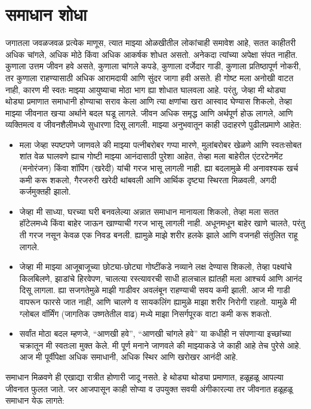  \chapter{समाधान शोधा}
जगातला जवळजवळ प्रत्येक माणूस, त्यात माझ्या ओळखीतील लोकांचाही समावेश आहे, सतत काहीतरी अधिक चांगले, अधिक मोठे किंवा अधिक आकर्षक शोधत असतो. अनेकदा त्यांच्या अपेक्षा संपत नाहीत. कुणाला उत्तम जीवन हवे असते, कुणाला चांगले कपडे, कुणाला दर्जेदार गाडी, कुणाला प्रतिष्ठापूर्ण नोकरी, तर कुणाला राहण्यासाठी अधिक आरामदायी आणि सुंदर जागा हवी असते.
ही गोष्ट मला अनोखी वाटत नाही, कारण मी स्वतः माझ्या आयुष्याचा मोठा भाग ह्या शोधात घालवला आहे. परंतु, जेव्हा मी थोड्या थोड्या प्रमाणात समाधानी होण्याचा सराव केला आणि त्या क्षणांचा खरा आस्वाद घेण्यास शिकलो, तेव्हा माझ्या जीवनात खऱ्या अर्थाने बदल घडू लागले. जीवन अधिक समृद्ध आणि अर्थपूर्ण होऊ लागले, आणि व्यक्तिमत्व व जीवनशैलीमध्ये सुधारणा दिसू लागली.
माझ्या अनुभवातून काही उदाहरणे पुढीलप्रमाणे आहेत:
\begin{itemize}
 \item मला जेव्हा स्पष्टपणे जाणवले की माझ्या पत्नीबरोबर गप्पा मारणे, मुलांबरोबर खेळणे आणि स्वतःसोबत शांत वेळ घालवणे ह्याच गोष्टी माझ्या आनंदासाठी पुरेशा आहेत, तेव्हा मला बाहेरील एंटरटेनमेंट (मनोरंजन) किंवा शॉपिंग (खरेदी) यांची गरज भासू लागली नाही. ह्या बदलामुळे मी अनावश्यक खर्च कमी करू शकलो, गैरजरुरी खरेदी थांबवली आणि आर्थिक दृष्ट्या स्थिरता मिळवली, अगदी कर्जमुक्तही झालो.
\item जेव्हा मी साध्या, घरच्या घरी बनवलेल्या अन्नात समाधान मानायला शिकलो, तेव्हा मला सतत हॉटेलमध्ये किंवा बाहेर जाऊन खाण्याची गरज भासू लागली नाही. अधूनमधून बाहेर खाणे चालते, परंतु ती गरज नसून केवळ एक निवड बनली. ह्यामुळे माझे शरीर हलके झाले आणि वजनही संतुलित राहू लागले.
\item जेव्हा मी माझ्या आजूबाजूच्या छोट्या-छोट्या गोष्टींकडे नव्याने लक्ष देण्यास शिकलो, तेव्हा पक्ष्यांचे किलबिलणे, झाडांचे हिरवेपण, चालत्या रस्त्यावरची साधी हालचाल ह्यांतही मला आश्चर्य आणि आनंद दिसू लागला. ह्या सजगतेमुळे माझी गाडीवर अवलंबून राहण्याची सवय कमी झाली. आज मी गाडी वापरून फारसे जात नाही, आणि चालणे व सायकलिंग ह्यामुळे माझा शरीर निरोगी राहतो. यामुळे मी ग्लोबल वॉर्मिंग (जागतिक उष्णतेतील वाढ) मध्ये माझा निसर्गपूरक वाटा कमी करू शकतो.
\item सर्वांत मोठा बदल म्हणजे, “आणखी हवे”, “आणखी चांगले हवे” या कधीही न संपणाऱ्या इच्छांच्या चक्रातून मी स्वतःला मुक्त केले. मी पूर्ण मनाने जाणवले की माझ्याकडे जे काही आहे तेच पुरेसे आहे. आज मी पूर्वीपेक्षा अधिक समाधानी, अधिक स्थिर आणि खरोखर आनंदी आहे.
 \end{itemize}
समाधान मिळवणे ही एखाद्या रात्रीत होणारी जादू नसते. हे थोड्या थोड्या प्रमाणात, हळूहळू आपल्या जीवनात फुलत जाते. जर आजपासून काही सोप्या व उपयुक्त सवयी अंगीकारल्या तर जीवनात हळूहळू समाधान येऊ लागते:
